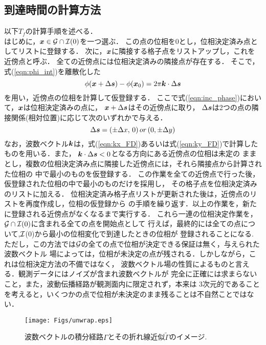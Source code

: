 \subsection{到達時間の計算方法}
以下$T_f$の計算手順を述べる．\\
はじめに，$\fat{x}\in {\cal G}\cap {\cal I}(0)$を一つ選ぶ．
この点の位相を0とし，位相決定済み点としてリストに登録する．
次に，$\mbox{\boldmath{$x$}}$に隣接する格子点をリストアップし，これを近傍点と呼ぶ．
全ての近傍点には位相決定済みの隣接点が存在する．
そこで， 式(\ref{eqn:phi_int})を離散化した
\begin{equation}
	\phi(\fat{x}+\Delta \fat{s}) -\phi(\fat{x}_0) = 2\pi \fat{k} \cdot \Delta \fat{s}
	\label{eqn:inc_phase}
\end{equation}
を用い，近傍点の位相を計算して仮登録する．
ここで式(\ref{eqn:inc_phase})において，$\mbox{\boldmath{$x$}}$は位相決定済みの点に，
$\mbox{\boldmath{$x$}}+\Delta \mbox{\boldmath{$s$}}$はその近傍点に取り，
$\Delta \mbox{\boldmath{$s$}}$は2つの点の隣接関係(相対位置)に応じて次のいずれかで与える．
\begin{equation}
	\Delta \fat{s} = (\pm \Delta x,\,0) \, or \, (0,\pm \Delta y)
	\label{eqn:} \end{equation}
なお，波数ベクトル$\mbox{\boldmath{$k$}}$は，式(\ref{eqn:kx_FD})あるいは式(\ref{eqn:ky_FD})で計算した
ものを用いる．また， $\mbox{\boldmath{$k$}}\cdot \Delta \mbox{\boldmath{$s$}}<0$となる方向にある近傍点の位相は未定の
ままとし，複数の位相決定済み点に隣接した近傍点には，それら隣接点から計算された位相の
中で最小のものを仮登録する．
この作業を全ての近傍点で行った後，仮登録された位相の中で最小のものだけを採用し，
その格子点を位相決定済みのリストに加える．
位相決定済み格子点リストが更新された後は，近傍点のリストを再度作成し，位相の仮登録から
の手順を繰り返す．以上の作業を，新たに登録される近傍点がなくなるまで実行する．
これら一連の位相決定作業を，${\cal G}\cap {\cal I}(0)$に含まれる全ての点を開始点として
行えば，最終的には全ての点について,$\cal I$(0)から最小の位相変化で到達したときの位相が
登録されることになる.
ただし，この方法では$\cal G$の全ての点で位相が決定できる保証は無く，与えられた波数ベクトル
場によっては，位相が未決定の点が残される．しかしながら，これは位相決定方法の不備ではなく，
波数ベクトル場の性質によるものと言える．観測データにはノイズが含まれ波数ベクトルが
完全に正確には求まらないこと，また，波動伝播経路が観測面内に限定されず，本来は
3次元的であることを考えると，いくつかの点で位相が未決定のまま残ることは不自然ことではない．
\begin{figure}
\begin{center}
	\texttt{[image: Figs/unwrap.eps]}
	\caption{波数ベクトルの積分経路$\Gamma$とその折れ線近似$\tilde \Gamma$のイメージ.}
	\label{fig:fig12}
\end{center}
\end{figure}
